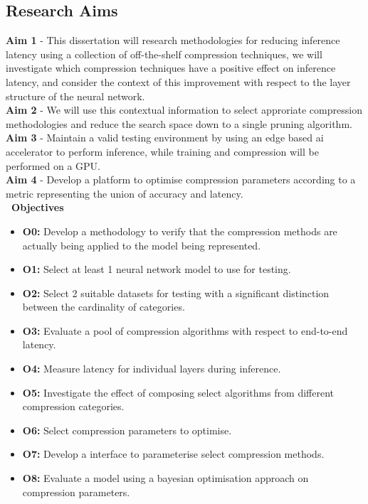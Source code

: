 \documentclass[../Dissertation.tex]{subfiles}
\begin{document}
\subsection{Research Aims}
\textbf{Aim 1}\label{Aim1} - This dissertation will research methodologies for reducing inference latency using a collection of off-the-shelf compression techniques, we will investigate which compression techniques have a positive effect on inference latency, and consider the context of this improvement with respect to the layer structure of the neural network.\\ 
\noindent\textbf{Aim 2}\label{Aim2} - We will use this contextual information to select approriate compression methodologies and reduce the search space down to a single pruning algorithm.\\
\noindent\textbf{Aim 3}\label{Aim3} - Maintain a valid testing environment by using an edge based ai accelerator to perform inference, while training and compression will be performed on a GPU.\\
\noindent\textbf{Aim 4}\label{Aim4} - Develop a platform to optimise compression parameters according to a metric representing the union of accuracy and latency.\\
\textbf{\large~Objectives}
\begin{itemize}
    \item \textbf{O0:}\label{obj:VerifyComp} Develop a methodology to verify that the compression methods are actually being applied to the model being represented.
    \item \textbf{O1:}\label{obj:ModelSel} Select at least 1 neural network model to use for testing.
    \item \textbf{O2:}\label{obj:DataSel} Select 2 suitable datasets for testing with a significant distinction between the cardinality of categories.
    \item \textbf{O3:}\label{obj:EvalE2E} Evaluate a pool of compression algorithms with respect to end-to-end latency.
    \item \textbf{O4:}\label{obj:EvalLayer} Measure latency for individual layers during inference.
    \item \textbf{O5:}\label{obj:EvalComp} Investigate the effect of composing select algorithms from different compression categories. 
    \item \textbf{O6:}\label{obj:ParaSel} Select compression parameters to optimise.
    \item \textbf{O7:}\label{obj:CompPara} Develop a interface to parameterise select compression methods.
    \item \textbf{O8:}\label{obj:TestOpt} Evaluate a model using a bayesian optimisation approach on compression parameters.
\end{itemize}
\end{document}
